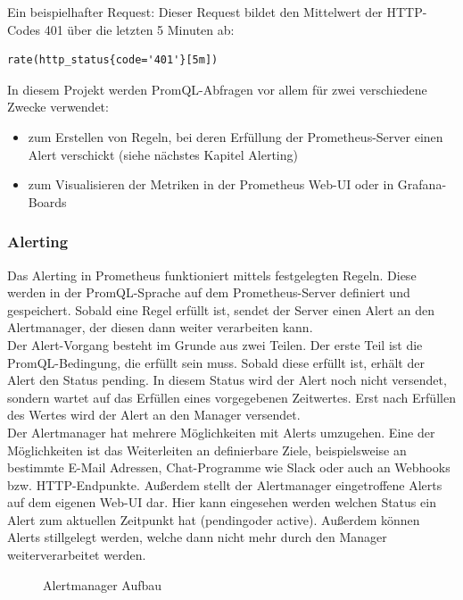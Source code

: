 \documentclass[a4paper,10pt]{scrartcl}
\begin{document}
Ein beispielhafter Request:
Dieser Request bildet den Mittelwert der HTTP-Codes 401 über die letzten 5 Minuten ab:
\begin{lstlisting}
rate(http_status{code='401'}[5m])
\end{lstlisting}

In diesem Projekt werden PromQL-Abfragen vor allem für zwei verschiedene Zwecke verwendet:
\begin{itemize}
\item zum Erstellen von Regeln, bei deren Erfüllung der Prometheus-Server einen Alert verschickt (siehe nächstes Kapitel Alerting)
\item zum Visualisieren der Metriken in der Prometheus Web-UI oder in Grafana-Boards
\end{itemize}

\subsubsection{Alerting}

Das Alerting in Prometheus funktioniert mittels festgelegten Regeln. Diese werden in der PromQL-Sprache auf dem Prometheus-Server definiert und gespeichert. Sobald eine Regel erfüllt ist, sendet der Server einen Alert an den Alertmanager, der diesen dann weiter verarbeiten kann.\\
Der Alert-Vorgang besteht im Grunde aus zwei Teilen. Der erste Teil ist die PromQL-Bedingung, die erfüllt sein muss. Sobald diese erfüllt ist, erhält der Alert den Status \glqq pending\grqq. In diesem Status wird der Alert noch nicht versendet, sondern wartet auf das Erfüllen eines vorgegebenen Zeitwertes. Erst nach Erfüllen des Wertes wird der Alert an den Manager versendet.\\

Der Alertmanager hat mehrere Möglichkeiten mit Alerts umzugehen. Eine der Möglichkeiten ist das Weiterleiten an definierbare Ziele, beispielsweise an bestimmte E-Mail Adressen, Chat-Programme wie Slack oder auch an Webhooks bzw. HTTP-Endpunkte. Außerdem stellt der Alertmanager eingetroffene Alerts auf dem eigenen Web-UI dar. Hier kann eingesehen werden welchen Status ein Alert zum aktuellen Zeitpunkt hat (\glqq pending\grqq oder \glqq active\grqq). Außerdem können Alerts stillgelegt werden, welche dann nicht mehr durch den Manager weiterverarbeitet werden.\\

\begin{figure}[htbp]
  \hspace{-1.7cm}
  \scalebox{.8}{}
  \caption{Alertmanager Aufbau}
\end{figure}
\end{document}
